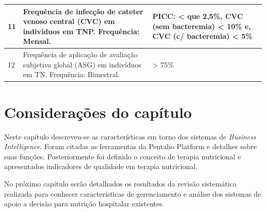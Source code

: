 \begin{quadro}[htb]
\begin{tabular}{|p{1cm}|p{9cm}|p{5cm}|}
    11 & Frequência de infecção de cateter venoso central (CVC) em indivíduos em
TNP. \newline Frequência: Mensal. & PICC: < que 2,5\%, CVC (sem bacteremia) < 10\% e, CVC (c/ bacteremia) < 5\% \\ \hline
    12 & Frequência de aplicação de avaliação subjetiva global (ASG) em indivíduos em
TN. \newline Frequência: Bimestral. & > 75\% \\ \hline
\end{tabular}
\end{quadro}

\section{Considerações do capítulo}
Neste capítulo descreveu-se as características em torno dos sistemas de \textit{Business Intelligence}. Foram citadas as ferramentas da Pentaho Platform e detalhes sobre suas funções. Posteriormente foi definido o conceito de terapia nutricional e apresentados indicadores de qualidade em terapia nutricional.

No próximo capitulo serão detalhados os resultados da revisão sistemática realizada para conhecer características de gerenciamento e análise dos sistemas de apoio a decisão para nutrição hospitalar existentes.